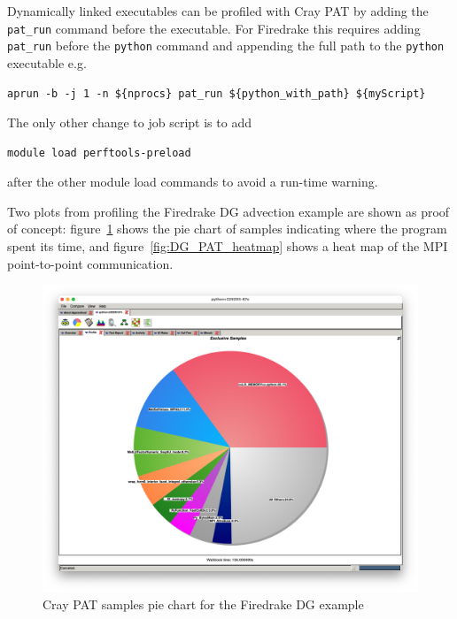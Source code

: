 \documentclass[a4paper,titlepage]{article}
\begin{document}
Dynamically linked executables can be profiled with Cray PAT by adding the \verb+pat_run+ command before the executable. For Firedrake this requires adding \verb+pat_run+ before the \verb+python+ command and appending the full path to the \verb+python+ executable e.g.
\begin{verbatim}
aprun -b -j 1 -n ${nprocs} pat_run ${python_with_path} ${myScript}
\end{verbatim}
The only other change to job script is to add 
\begin{verbatim}
module load perftools-preload
\end{verbatim}
after the other module load commands to avoid a run-time warning.

Two plots from profiling the Firedrake DG advection example are shown as proof of concept: figure~\ref{fig:DG_PAT_pie} shows the pie chart of samples indicating where the program spent its time, and figure~\ref{fig:DG_PAT_heatmap} shows a heat map of the MPI point-to-point communication.
%
\begin{figure}[htbp]
\begin{center}
\includegraphics[scale=0.3]{figures/DG_PAT1}
\caption{Cray PAT samples pie chart for the Firedrake DG example}
\label{fig:DG_PAT_pie}
\end{center}
\end{figure}
%
\end{document}
